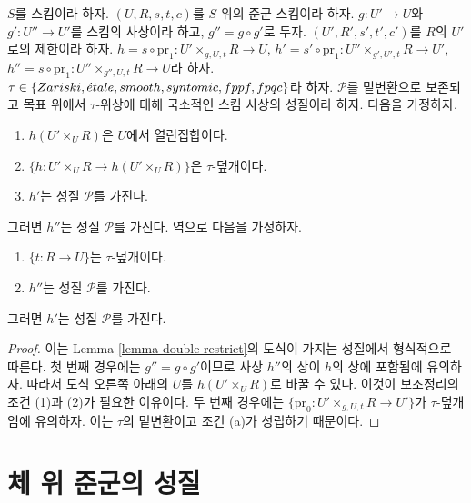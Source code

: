 \begin{lemma}
\label{lemma-double-restrict-property}
$S$를 스킴이라 하자.
$(U, R, s, t, c)$를 $S$ 위의 준군 스킴이라 하자.
$g : U' \to U$와 $g' : U'' \to U'$를 스킴의 사상이라 하고,
$g'' = g \circ g'$로 두자.
$(U', R', s', t', c')$를 $R$의 $U'$로의 제한이라 하자.
$h = s \circ \text{pr}_1 : U' \times_{g, U, t} R \to U$,
$h' = s' \circ \text{pr}_1 : U'' \times_{g', U', t} R \to U'$,
$h'' = s \circ \text{pr}_1 : U'' \times_{g'', U, t} R \to U$라 하자.
$\tau \in \{Zariski, \linebreak[0] \etale, \linebreak[0]
smooth, \linebreak[0] syntomic, \linebreak[0] fppf, \linebreak[0] fpqc\}$라 하자.
$\mathcal{P}$를 밑변환으로 보존되고 목표 위에서
$\tau$-위상에 대해 국소적인 스킴 사상의 성질이라 하자. 다음을 가정하자.
\begin{enumerate}
\item $h(U' \times_U R)$은 $U$에서 열린집합이다.
\item $\{h : U' \times_U R \to h(U' \times_U R)\}$은 $\tau$-덮개이다.
\item $h'$는 성질 $\mathcal{P}$를 가진다.
\end{enumerate}
그러면 $h''$는 성질 $\mathcal{P}$를 가진다. 역으로 다음을 가정하자.
\begin{enumerate}
\item[(a)] $\{t : R \to U\}$는 $\tau$-덮개이다.
\item[(d)] $h''$는 성질 $\mathcal{P}$를 가진다.
\end{enumerate}
그러면 $h'$는 성질 $\mathcal{P}$를 가진다.
\end{lemma}

\begin{proof}
이는 Lemma \ref{lemma-double-restrict}의 도식이 가지는 성질에서
형식적으로 따른다. 첫 번째 경우에는 $g'' = g \circ g'$이므로
사상 $h''$의 상이 $h$의 상에 포함됨에 유의하자. 따라서 도식 오른쪽 아래의
$U$를 $h(U' \times_U R)$로 바꿀 수 있다. 이것이 보조정리의 조건 (1)과
(2)가 필요한 이유이다. 두 번째 경우에는
$\{\text{pr}_0 : U' \times_{g, U, t} R \to U'\}$가 $\tau$-덮개임에 유의하자.
이는 $\tau$의 밑변환이고 조건 (a)가 성립하기 때문이다.
\end{proof}






\section{체 위 준군의 성질}
\label{section-properties-groupoids-on-fields}

